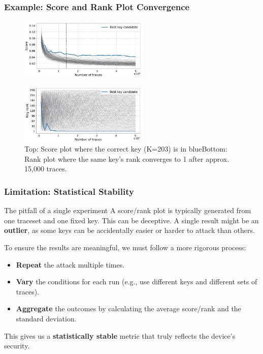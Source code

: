 \begin{frame}
    \frametitle{Example: Score and Rank Plot Convergence}
    \begin{figure}
        \centering
        \includegraphics[width=0.55\textwidth]{metrics/Pictures/score_plot.png}
    \end{figure}
    \begin{figure}
        \centering
        \includegraphics[width=0.55\textwidth]{metrics/Pictures/rank_plot.png}
        \caption{Top: Score plot where the correct key (K=203) is in blue\newline Bottom: Rank plot where the same key's rank converges to 1 after approx. 15,000 traces.}
    \end{figure}
\end{frame}


\begin{frame}
    \frametitle{Limitation: Statistical Stability}

    \begin{block}{The pitfall of a single experiment}
        A score/rank plot is typically generated from one traceset and one fixed key. This can be deceptive. \newline
        A single result might be an \textbf{outlier}, as some keys can be accidentally easier or harder to attack than others.
    \end{block}

        To ensure the results are meaningful, we must follow a more rigorous process:
        \begin{itemize}
            \item \textbf{Repeat} the attack multiple times.
            \item \textbf{Vary} the conditions for each run (e.g., use different keys and different sets of traces).
            \item \textbf{Aggregate} the outcomes by calculating the average score/rank and the standard deviation.
        \end{itemize}
        This gives us a \textbf{statistically stable} metric that truly reflects the device's security.
\end{frame}



